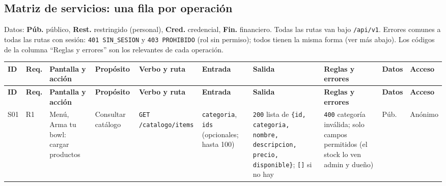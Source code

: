 \begin{landscape}
\subsection{Matriz de servicios: una fila por operación}
Datos: \textbf{Púb.} público, \textbf{Rest.} restringido (personal), \textbf{Cred.} credencial, \textbf{Fin.} financiero. Todas las rutas van bajo \texttt{/\allowbreak{}api/\allowbreak{}v1}. Errores comunes a todas las rutas con sesión: \texttt{401 SIN\_\allowbreak{}SESION} y \texttt{403 PROHIBIDO} (rol sin permiso); todos tienen la misma forma (ver más abajo). Los códigos de la columna “Reglas y errores” son los relevantes de cada operación.

\vspace{0.6em}
{\scriptsize
\setlength{\LTpre}{0pt}\setlength{\LTpost}{0pt}
\setlength{\tabcolsep}{3pt}\renewcommand{\arraystretch}{1.15}
\begin{longtable}{|>{\raggedright\arraybackslash}p{}|>{\raggedright\arraybackslash}p{}|>{\raggedright\arraybackslash}p{}|>{\raggedright\arraybackslash}p{}|>{\raggedright\arraybackslash}p{}|>{\raggedright\arraybackslash}p{}|>{\raggedright\arraybackslash}p{}|>{\raggedright\arraybackslash}p{}|>{\raggedright\arraybackslash}p{}|>{\raggedright\arraybackslash}p{}|}
\hline
\textbf{ID} & \textbf{Req.} & \textbf{Pantalla y acción} & \textbf{Propósito} & \textbf{Verbo y ruta} & \textbf{Entrada} & \textbf{Salida} & \textbf{Reglas y errores} & \textbf{Datos} & \textbf{Acceso} \\ \hline
\endfirsthead
\hline
\textbf{ID} & \textbf{Req.} & \textbf{Pantalla y acción} & \textbf{Propósito} & \textbf{Verbo y ruta} & \textbf{Entrada} & \textbf{Salida} & \textbf{Reglas y errores} & \textbf{Datos} & \textbf{Acceso} \\ \hline
\endhead
S01 & R1 & Menú, Arma tu bowl: cargar productos & Consultar catálogo & \texttt{GET /\allowbreak{}catalogo/\allowbreak{}items} & \texttt{categoria}, \texttt{ids} (opcionales; hasta 100) & \texttt{200} lista de \texttt{\{id,\allowbreak{} categoria,\allowbreak{} nombre,\allowbreak{} descripcion,\allowbreak{} precio,\allowbreak{} disponible\}}; \texttt{[\allowbreak{}]} si no hay & \texttt{400} categoría inválida; solo campos permitidos (el stock lo ven admin y dueño) & Púb. & Anónimo \\ \hline

\end{longtable}}
\end{landscape}
